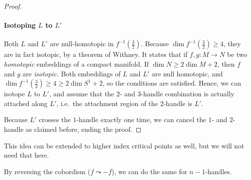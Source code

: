 \begin{proof}
    \paragraph{Isotoping $L$ to $L'$}
    Both $L$ and $L'$ are null-homotopic in  $f^{-1}(\frac{3}{2})$.
    Because $\dim f^{-1}(\frac{3}{2}) \ge 4$, they are in fact isotopic, by a theorem of Withney.
    It states that if $f, g: M \to N$ be two \emph{homotopic} embeddings of a compact manifold. If $\dim N \ge  2 \dim M + 2$, then $f$ and  $g$ are \emph{isotopic.}
    Both embeddings of $L$ and  $L'$ are null homotopic, and  $\dim f^{-1}(\frac{3}{2}) \ge 4 \ge  2 \dim S^{1} +  2$, so the conditions are satisfied.
    Hence, we can isotope $L$ to $L'$, and assume that the $2$- and  $3$-handle combination is actually attached along $L'$, i.e.\ the attachment region of the $2$-handle is $L'$.

    Because $L'$ crosses the  $1$-handle exactly one time, we can cancel the $1$- and $2$-handle as claimed before, ending the proof.
\end{proof}
\begin{remark}
    This idea can be extended to higher index critical points as well, but we will not need that here.
\end{remark}
\begin{remark}
    By reversing the cobordism ($f \leadsto -f$), we can do the same for $n-1$-handles.
\end{remark}


